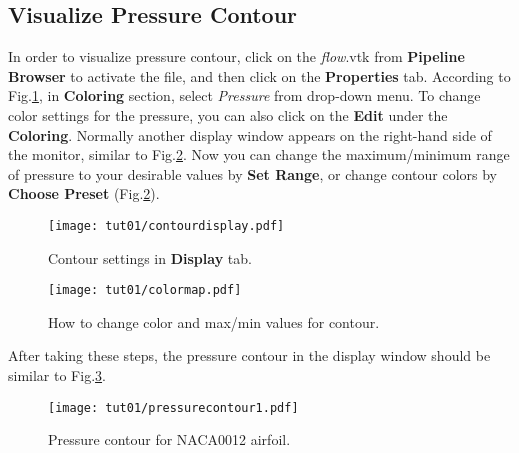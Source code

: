 \subsection{Visualize Pressure Contour}
In order to visualize pressure contour, click on the \textit{flow}.vtk from \textbf{Pipeline Browser} to activate the file, and then click on the \textbf{Properties} tab. According to Fig.\ref{fig1:colorby}, in \textbf{Coloring} section, select \textit{Pressure} from drop-down menu. To change color settings for the pressure, you can also click on the \textbf{Edit} under the \textbf{Coloring}. Normally another display window appears on the right-hand side of the monitor, similar to Fig.\ref{fig1:change_color_range}. Now you can change the maximum/minimum range of pressure to your desirable values by \textbf{Set Range}, or change contour colors by \textbf{Choose Preset} (Fig.\ref{fig1:change_color_range}).
\begin{figure}[htbp]
    \centering
    \texttt{[image: tut01/contourdisplay.pdf]}
    \caption{Contour settings in \textbf{Display} tab.}
    \label{fig1:colorby}
\end{figure}
\begin{figure}[htbp]
    \centering
    \texttt{[image: tut01/colormap.pdf]}
    \caption{How to change color and max/min values for contour.}
    \label{fig1:change_color_range}
\end{figure}
After taking these steps, the pressure contour in the display window should be similar to Fig.\ref{fig1:pressure_contour}.
\begin{figure}[htbp]
    \centering
    \texttt{[image: tut01/pressurecontour1.pdf]}
    \caption{Pressure contour for NACA0012 airfoil.}
    \label{fig1:pressure_contour}
\end{figure}

